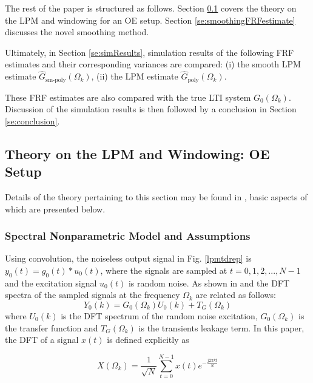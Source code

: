 The rest of the paper is structured as follows. Section \ref{se:theoryLPMandWindowing} covers the theory on the LPM and windowing for an OE setup. 
Section \ref{se:smoothingFRFestimate} discusses the novel smoothing method. 



Ultimately, in Section \ref{se:simResults}, simulation results of the following FRF estimates and their corresponding variances are compared: (i) the smooth LPM estimate $\hat{G}_\text{sm-poly}(\Omega_k)$, (ii) the LPM estimate $\hat{G}_\text{poly}(\Omega_k)$. 

These FRF estimates are also compared with the true LTI system ${G}_0(\Omega_k)$. Discussion of the simulation results is then followed by a conclusion in Section \ref{se:conclusion}.

\subsection{Theory on the LPM and Windowing: OE Setup}\label{se:theoryLPMandWindowing}


Details of the theory pertaining to this section may be found in \cite{schoukens2010nonparametric}, basic aspects of which are presented below.


\subsubsection{Spectral Nonparametric Model and Assumptions}

Using convolution, the noiseless output signal in Fig. \ref{lpmtdrep} is $y_0(t) = g_0(t)*u_0(t)$, where the signals are sampled at $t = 0, 1, 2,...,N-1$ and the excitation signal $u_0(t)$ is random noise. As shown in \cite{FDidentEd2Pintelon} and \cite{Pintelon1997} the DFT spectra of the sampled signals at the frequency $\Omega_k$ are related as follows:
\begin{equation}\label{lpmleak}
Y_0(k)=G_0(\Omega_k)U_0(k)+T_G(\Omega_k)
\end{equation}
where $U_0(k)$ is the DFT spectrum of the random noise excitation,  $G_0(\Omega_k)$ is the transfer function and $T_G(\Omega_k)$ is the transients leakage term. 
In this paper, the DFT of a signal $x(t)$ is defined explicitly as  \cite{Oppenheim1983}

\begin{equation}\label{eq:defDFT}
X(\Omega_k) = \frac{1}{\sqrt{N}}\sum_{t=0}^{N-1}x(t)e^{-\frac{j2\pi kt}{N}}
\end{equation}



